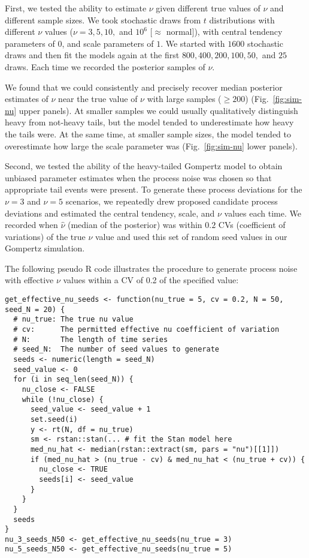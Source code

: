 \documentclass[12pt]{article}
\begin{document}
First, we tested the ability to estimate $\nu$ given different true values of
$\nu$ and different sample sizes. We took stochastic draws from $t$
distributions with different $\nu$ values ($\nu = 3, 5, 10,$ and $10^6$
[$\approx$ normal]), with central tendency parameters of $0$, and scale
parameters of $1$. We started with $1600$ stochastic draws and then fit the
models again at the first $800, 400, 200, 100, 50,$ and $25$ draws. Each time
we recorded the posterior samples of $\nu$.

We found that we could consistently and precisely recover median posterior
estimates of \(\nu\) near the true value of \(\nu\) with large samples (\(\ge
200\)) (Fig.~\ref{fig:sim-nu} upper panels). At smaller samples we could
usually qualitatively distinguish heavy from not-heavy tails, but the model
tended to underestimate how heavy the tails were. At the same time, at smaller
sample sizes, the model tended to overestimate how large the scale parameter
was (Fig.~\ref{fig:sim-nu} lower panels).

Second, we tested the ability of the heavy-tailed Gompertz model to obtain
unbiased parameter estimates when the process noise was chosen so that
appropriate tail events were present. To generate these process deviations for
the $\nu = 3$ and $\nu = 5$ scenarios, we repeatedly drew proposed candidate
process deviations and estimated the central tendency, scale, and $\nu$ values
each time. We recorded when $\hat{\nu}$ (median of the posterior) was within
$0.2$ CVs (coefficient of variations) of the true $\nu$ value and used this
set of random seed values in our Gompertz simulation.

The following pseudo R code illustrates the procedure to generate process
noise with effective $\nu$ values within a CV of 0.2 of the specified value:

\clearpage

\begin{footnotesize}
\begin{verbatim}
get_effective_nu_seeds <- function(nu_true = 5, cv = 0.2, N = 50, seed_N = 20) {
  # nu_true: The true nu value
  # cv:      The permitted effective nu coefficient of variation
  # N:       The length of time series
  # seed_N:  The number of seed values to generate
  seeds <- numeric(length = seed_N)
  seed_value <- 0
  for (i in seq_len(seed_N)) {
    nu_close <- FALSE
    while (!nu_close) {
      seed_value <- seed_value + 1
      set.seed(i)
      y <- rt(N, df = nu_true)
      sm <- rstan::stan(... # fit the Stan model here
      med_nu_hat <- median(rstan::extract(sm, pars = "nu")[[1]])
      if (med_nu_hat > (nu_true - cv) & med_nu_hat < (nu_true + cv)) {
        nu_close <- TRUE
        seeds[i] <- seed_value
      }
    }
  }
  seeds
}
nu_3_seeds_N50 <- get_effective_nu_seeds(nu_true = 3)
nu_5_seeds_N50 <- get_effective_nu_seeds(nu_true = 5)
\end{verbatim}
\end{footnotesize}
\end{document}
